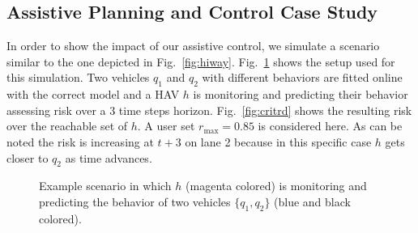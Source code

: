 \documentclass[letterpaper, 10 pt, conference]{ieeeconf}  %
\begin{document}
\subsection{Assistive Planning and Control Case Study}
In order to show the impact of our assistive control, we simulate a scenario similar to the one depicted in Fig.~\ref{fig:hiway}. 
Fig.~\ref{fig:critpt} shows the setup used for this simulation. Two vehicles $q_1$ and $q_2$ with different behaviors are fitted online with the correct model and a HAV $h$ is monitoring and predicting their behavior assessing risk over a 3 time steps horizon. 
Fig.~\ref{fig:critrd} shows the resulting risk over the reachable set of $h$. A user set $r_{\max} = 0.85$ is considered here. As can be noted the risk is increasing at $t+3$ on lane 2 because in this specific case $h$ gets closer to $q_2$ as time advances. 


\begin{figure}[ht!]
	\centering
	\vspace{-5pt}
	\caption{Example scenario in which $h$ (magenta colored) is monitoring and predicting the behavior of two vehicles $\{q_1,q_2\}$ (blue and black colored).}
	\label{fig:critpt}
	\vspace{-5pt}
\end{figure}
\end{document}
